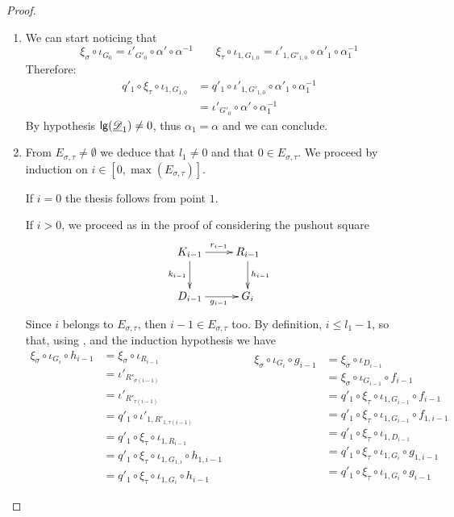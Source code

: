 \begin{proof}
\begin{enumerate}
		
		\item We can start noticing that
		\[\xi_\sigma \circ \iota_{G_0}=\iota'_{G'_0}\circ \alpha'\circ \alpha^{-1} \qquad \xi_{\tau} \circ \iota_{1,G_{1,0}}= \iota'_{1, G'_{1,0}} \circ \alpha'_1\circ \alpha^{-1}_1\] 
		Therefore:
		\begin{align*}
		q'_1\circ \xi_{\tau} \circ \iota_{1, G_{1,0}}&=q'_1 \circ \iota'_{1, G'_{1,0}} \circ \alpha'_1\circ \alpha^{-1}_1\\ &= \iota'_{G'_{0}}\circ \alpha' \circ \alpha^{-1}_1
		\end{align*}
		By hypothesis $\mathsf{lg}(\underline{\mathscr{D}}_1) \neq 0$, thus $\alpha_1=\alpha$ and we can conclude.
		
		\item  From $E_{\sigma, \tau}\neq \emptyset$ we deduce that $l_1\neq 0$ and that $0\in E_{\sigma, \tau}$.   We proceed by induction on $i\in [0,\max(E_{\sigma, \tau})]$. 

\smallskip \noindent  If $i=0$ the thesis follows from point $1$.

\smallskip \noindent If $i>0$, we proceed as in the proof of  considering the pushout square
			\[\xymatrix{K_{i-1}\ar[r]^{r_{i-1}} \ar[d]_{k_{i-1}}& R_{i-1} \ar[d]^{h_{i-1}}\\ D_{i-1} \ar[r]_{g_{i-1}}& G_i}\] 
		Since $i$ belongs to $E_{\sigma, \tau}$, then $i-1\in E_{\sigma, \tau}$ too. By definition, $i\leq l_1-1$, so that, using ,  and the induction hypothesis we have
			\[\begin{split}
				\xi_\sigma \circ \iota_{G_i}\circ h_{i-1}&=  \xi_\sigma\circ \iota_{R_{i-1}}\\&=\iota'_{R'_{\sigma(i-1)}}\\&=\iota'_{R'_{\tau(i-1)}}\\&=q'_1\circ \iota'_{1, R'_{1,\tau(i-1)}}\\&=q'_1\circ \xi_{\tau}\circ \iota_{1, R_{i-1}}\\&=q'_1\circ \xi_{\tau} \circ \iota_{1, G_{1,i}}\circ h_{1, i-1}\\&=q'_1\circ \xi_\tau \circ \iota_{1, G_i} \circ h_{i-1}
			\end{split} \qquad  \begin{split}
			\xi_\sigma \circ \iota_{G_i}\circ g_{i-1}&=\xi_{\sigma}\circ \iota_{D_{i-1}}\\&=\xi_{\sigma}\circ \iota_{G_{i-1}} \circ f_{i-1}\\&=q'_1 \circ \xi_{\tau} \circ \iota_{1, G_{i-1}} \circ f_{i-1}\\&=q'_1 \circ \xi_{\tau} \circ \iota_{1, G_{i-1}} \circ f_{1, i-1}\\&=q'_1 \circ \xi_{\tau} \circ \iota_{1, D_{i-1}}\\&=q'_1 \circ \xi_{\tau} \circ \iota_{1, G_i}\circ g_{1, i-1}\\&=q'_1 \circ \xi_{\tau} \circ \iota_{1, G_i}\circ g_{i-1}
			\end{split}\]
	

\end{enumerate}
\end{proof}
